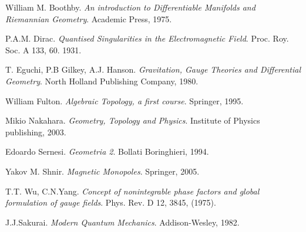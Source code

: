 \begin{thebibliography}{9}

William M. Boothby.
\textit{An introduction to Differentiable Manifolds and Riemannian Geometry}.
Academic Press, 1975.

P.A.M. Dirac.
\textit{Quantised Singularities in the Electromagnetic Field}.
Proc. Roy. Soc. A 133, 60. 1931.

T. Eguchi, P.B Gilkey, A.J. Hanson.
\textit{Gravitation, Gauge Theories and Differential Geometry}.
North Holland Publishing Company, 1980.

  William Fulton.
  \textit{Algebraic Topology, a first course}.
  Springer, 1995.

   Mikio Nakahara.
   \textit{Geometry, Topology and Physics}.
   Institute of Physics publishing, 2003.

   Edoardo Sernesi.
   \textit{Geometria 2}.
   Bollati Boringhieri, 1994.

  Yakov M. Shnir.
  \textit{Magnetic Monopoles}.
  Springer, 2005.

   T.T. Wu, C.N.Yang.
   \textit{Concept of nonintegrable phase factors and global formulation of gauge fields}.
   Phys. Rev. D 12, 3845, (1975).


  J.J.Sakurai.
  \textit{Modern Quantum Mechanics}.
  Addison-Wesley, 1982.

\end{thebibliography}
